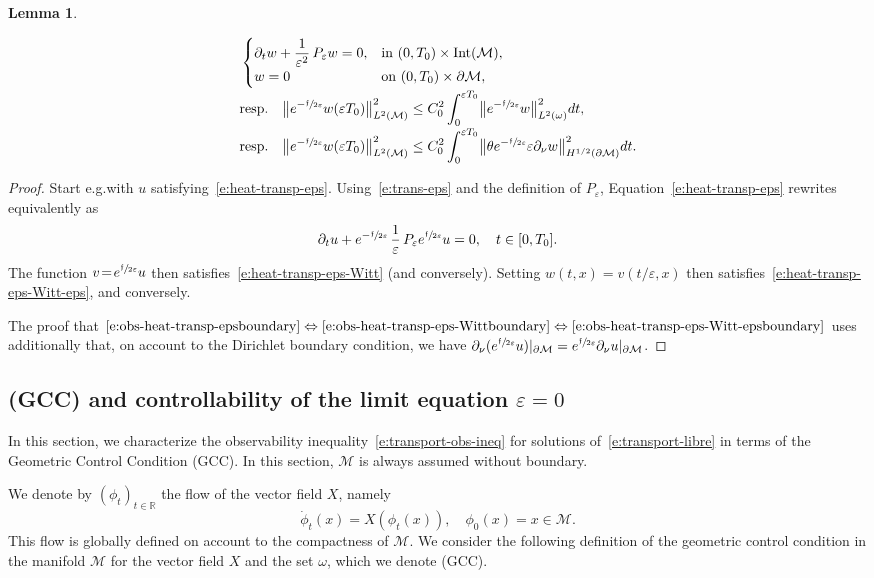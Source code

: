 \documentclass[10pt]{amsart}
\newcommand{\pGCC}{\textup{(GCC)}\xspace}
\newtheorem{lemma}{Lemma}[section]
\theoremstyle{definition}
\newcommand{\M}{\ensuremath{\mathcal M}}
\newcommand{\mb}[1]{\ensuremath{\mathbb{#1}}}
\newcommand{\R}{{\mb{R}}}
\newcommand{\f}{\ensuremath{\mathfrak{f}}}
\DeclareMathOperator{\Int}{Int}
\newcommand\bnp{\begin{proof}}
\newcommand\enp{\end{proof}}
\newcommand\bnor[2]{\bigl\|#1\bigr\|_{#2}}
\let\d\partial
\let\eps\varepsilon
\providecommand{\eg}{e.g.}\providecommand{\ie}{i.e.}\providecommand{\etc}{etc.}
\providecommand{\resp}{resp.}\providecommand{\cf}{cf.}
\begin{document}
\begin{lemma}
\begin{enumerate}
\begin{align}
\label{e:heat-transp-eps-Witt-eps}
&\begin{cases}
\partial_t w + \dfrac{1}{\eps^2}\,P_\eps w =0, & \text{in } (0,T_0)\times\Int(\M), \\
w = 0 & \text{on } (0,T_0)\times \d\M,
\end{cases}
\\[-2pt]
&\text{\resp }\quad \bnor{e^{-\sfrac{\f}{2\eps}}w(\eps T_0)}{L^2(\M)}^2 \leq C_0^2\int_0^{\eps T_0}\bnor{e^{-\sfrac{\f}{2\eps}}w}{L^2(\omega)}^2 dt,\nonumber \\[-2pt]
\label{e:obs-heat-transp-eps-Witt-epsboundary}
&\text{\resp } \quad \bnor{e^{-\sfrac{\f}{2\eps}}w(\eps T_0)}{L^2(\M)}^2 \leq C_0^2\int_0^{\eps T_0}\bnor{\theta e^{-\sfrac{\f}{2\eps}} \eps \partial_{\nu}w}{H^{1/2}(\d\M)}^2 dt.
\end{align}
\end{enumerate}
\end{lemma}
\bnp
Start \eg with $u$ satisfying~\eqref{e:heat-transp-eps}.
Using~\eqref{e:trans-eps} and the definition of $P_\eps$, Equation~\eqref{e:heat-transp-eps} rewrites equivalently as\vspace*{-3pt}
\[
\partial_t u + e^{-\sfrac{\f}{2\eps}}\, \frac{1}{\eps}\,P_\eps e^{\sfrac{\f}{2\eps}} u=0, \quad t \in [0,T_0].
\]
The function $v\!=\! e^{\sfrac{\f}{2\eps}} u$ then satisfies~\eqref{e:heat-transp-eps-Witt} (and conversely). Setting $w(t,x) \!=\! v(t/\eps, x)$ then satisfies~\eqref{e:heat-transp-eps-Witt-eps}, and conversely.

The proof that $\eqref{e:obs-heat-transp-epsboundary}\Leftrightarrow\eqref{e:obs-heat-transp-eps-Wittboundary}\Leftrightarrow\eqref{e:obs-heat-transp-eps-Witt-epsboundary}$ uses additionally that, on account to the Dirichlet boundary condition, we have $\d_\nu(e^{\sfrac{\f}{2\eps}} u) |_{\d\M} =e^{\sfrac{\f}{2\eps}} \d_\nu u |_{\d\M}$.
\enp

\subsection{\pGCC and controllability of the limit equation $\eps=0$}
\label{s:GCC}
In this section, we characterize the observability inequality~\eqref{e:transport-obs-ineq} for solutions of~\eqref{e:transport-libre} in terms of the Geometric Control Condition \pGCC. In this section, $\M$ is always assumed without boundary.

We denote by $(\phi_t)_{t\in \R}$ the flow of the vector field $X$, namely\vspace*{-3pt}
\begin{equation}
\label{e:def-flot}
\dot{\phi}_t(x) = X(\phi_t(x)),\quad \phi_0(x) = x \in \M.
\end{equation}
This flow is globally defined on account to the compactness of $\M$.
We consider the following definition of the geometric control condition in the manifold $\M$ for the vector field $X$ and the set $\omega$, which we denote \pGCC.
\end{document}
